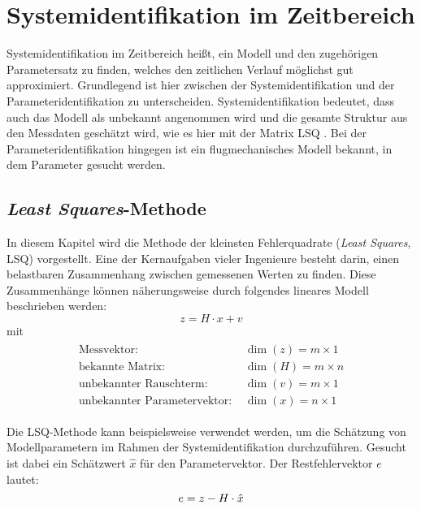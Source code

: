 \chapter{Systemidentifikation im Zeitbereich}
Systemidentifikation im Zeitbereich heißt, ein Modell und den zugehörigen Parametersatz zu finden, welches den zeitlichen Verlauf möglichst gut approximiert. Grundlegend ist hier zwischen der Systemidentifikation und der Parameteridentifikation zu unterscheiden. Systemidentifikation bedeutet, dass auch das Modell als unbekannt angenommen wird und die gesamte Struktur aus den Messdaten geschätzt wird, wie es hier mit der Matrix LSQ . Bei der Parameteridentifikation hingegen ist ein flugmechanisches Modell bekannt, in dem Parameter gesucht werden.

\section{\textit{Least Squares}-Methode}
In diesem Kapitel wird die Methode der kleinsten Fehlerquadrate (\textit{Least Squares}, LSQ) vorgestellt.
Eine der Kernaufgaben vieler Ingenieure besteht darin, einen belastbaren Zusammenhang zwischen gemessenen Werten zu finden. 
Diese Zusammenhänge können näherungsweise durch folgendes lineares Modell beschrieben werden:  
\begin{equation}
    z = H\cdot x+v 
\end{equation}
mit 
\begin{align}
	\begin{split}
		\text{Messvektor: } &\dim{(z)} = m\times 1\\
		\text{bekannte Matrix: } &\dim{(H)} = m\times n\\
		\text{unbekannter Rauschterm: } &\dim{(v)} = m\times1\\
		\text{unbekannter Parametervektor: } &\dim{(x)} = n\times 1
		\nonumber
	\end{split}
\end{align}

Die LSQ-Methode kann beispielsweise verwendet werden, um die Schätzung von Modellparametern im Rahmen der 
Systemidentifikation durchzuführen. Gesucht ist dabei ein Schätzwert $\hat{x}$ für den Parametervektor. Der Restfehlervektor 
$e$ lautet:
\begin{equation}
    e = z - H\cdot \hat{x} \\
\end{equation}

